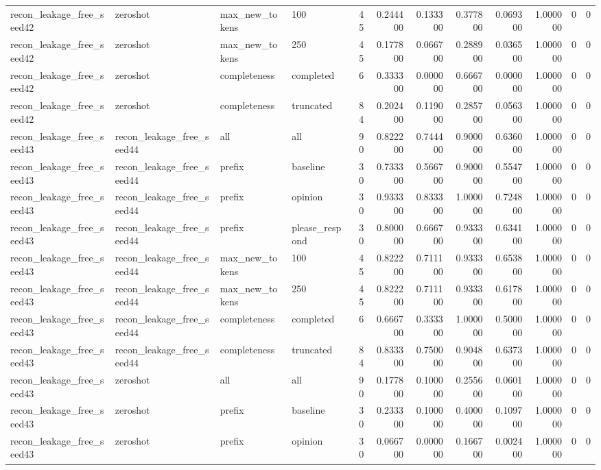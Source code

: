 \begin{tabular}{llllrrrrrrrr}
recon_leakage_free_seed42 & zeroshot & max_new_tokens & 100 & 45 & 0.244400 & 0.133300 & 0.377800 & 0.069300 & 1.000000 & 0 & 0 \\
recon_leakage_free_seed42 & zeroshot & max_new_tokens & 250 & 45 & 0.177800 & 0.066700 & 0.288900 & 0.036500 & 1.000000 & 0 & 0 \\
recon_leakage_free_seed42 & zeroshot & completeness & completed & 6 & 0.333300 & 0.000000 & 0.666700 & 0.000000 & 1.000000 & 0 & 0 \\
recon_leakage_free_seed42 & zeroshot & completeness & truncated & 84 & 0.202400 & 0.119000 & 0.285700 & 0.056300 & 1.000000 & 0 & 0 \\
recon_leakage_free_seed43 & recon_leakage_free_seed44 & all & all & 90 & 0.822200 & 0.744400 & 0.900000 & 0.636000 & 1.000000 & 0 & 0 \\
recon_leakage_free_seed43 & recon_leakage_free_seed44 & prefix & baseline & 30 & 0.733300 & 0.566700 & 0.900000 & 0.554700 & 1.000000 & 0 & 0 \\
recon_leakage_free_seed43 & recon_leakage_free_seed44 & prefix & opinion & 30 & 0.933300 & 0.833300 & 1.000000 & 0.724800 & 1.000000 & 0 & 0 \\
recon_leakage_free_seed43 & recon_leakage_free_seed44 & prefix & please_respond & 30 & 0.800000 & 0.666700 & 0.933300 & 0.634100 & 1.000000 & 0 & 0 \\
recon_leakage_free_seed43 & recon_leakage_free_seed44 & max_new_tokens & 100 & 45 & 0.822200 & 0.711100 & 0.933300 & 0.653800 & 1.000000 & 0 & 0 \\
recon_leakage_free_seed43 & recon_leakage_free_seed44 & max_new_tokens & 250 & 45 & 0.822200 & 0.711100 & 0.933300 & 0.617800 & 1.000000 & 0 & 0 \\
recon_leakage_free_seed43 & recon_leakage_free_seed44 & completeness & completed & 6 & 0.666700 & 0.333300 & 1.000000 & 0.500000 & 1.000000 & 0 & 0 \\
recon_leakage_free_seed43 & recon_leakage_free_seed44 & completeness & truncated & 84 & 0.833300 & 0.750000 & 0.904800 & 0.637300 & 1.000000 & 0 & 0 \\
recon_leakage_free_seed43 & zeroshot & all & all & 90 & 0.177800 & 0.100000 & 0.255600 & 0.060100 & 1.000000 & 0 & 0 \\
recon_leakage_free_seed43 & zeroshot & prefix & baseline & 30 & 0.233300 & 0.100000 & 0.400000 & 0.109700 & 1.000000 & 0 & 0 \\
recon_leakage_free_seed43 & zeroshot & prefix & opinion & 30 & 0.066700 & 0.000000 & 0.166700 & 0.002400 & 1.000000 & 0 & 0 \\

\end{tabular}
